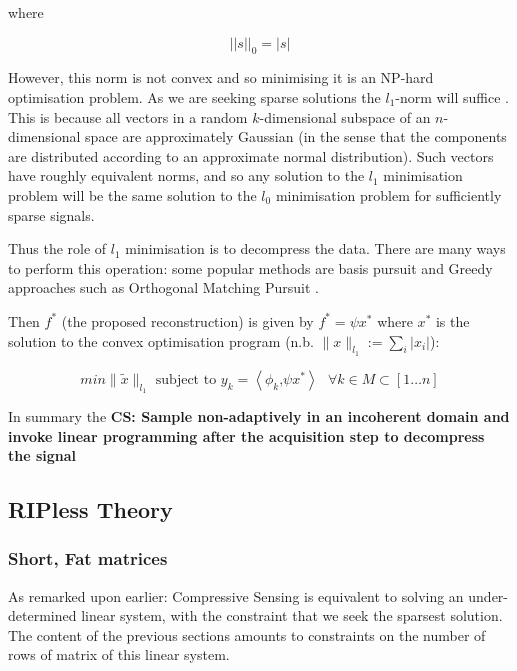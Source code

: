 where 

\begin{equation}
|| s ||_0 = |s|
\end{equation}

However, this norm is not convex and so minimising it is an NP-hard optimisation problem. As we are seeking sparse solutions the \(l_1\)-norm will suffice \cite{Donoho2006a}. This is because all vectors in a random \(k\)-dimensional subspace of an \(n\)-dimensional space are approximately Gaussian (in the sense that the components are distributed according to an approximate normal distribution). Such vectors have roughly equivalent norms, and so any solution to the \(l_1\) minimisation problem will be the same solution to the \(l_0\) minimisation problem for sufficiently sparse signals.

Thus the role of \(l_{1}\) minimisation is to decompress the data. There are many ways to perform this operation: some popular methods are basis pursuit \cite{Chen1998} and Greedy approaches such as Orthogonal Matching Pursuit \cite{Tropp2007}. 

Then \(f^*\) (the proposed reconstruction) is given by \(f^* = \psi x^*\) where \(x^*\) is the solution to the convex optimisation program (n.b. \(\| x\|_{l_{1}} := \sum_{i} |x_{i}| \)):

\begin{equation}
min\|\tilde{x}\|_{l_{1}} \text{ subject to } y_{k} = \left\langle \phi_{k} \text{,} \psi x^* \right\rangle \text{   } \forall k \in M \subset [1 \ldots n]
\end{equation}
\label{programl0}

In summary the \textbf{CS: Sample non-adaptively in an incoherent domain and invoke linear programming after the acquisition step to decompress the signal}

\subsection{RIPless Theory}


\subsubsection{Short, Fat matrices}
As remarked upon earlier: Compressive Sensing is equivalent to solving an under-determined linear system, with the constraint that we seek the sparsest solution. The content of the previous sections amounts to constraints on the number of rows of matrix of this linear system. 

